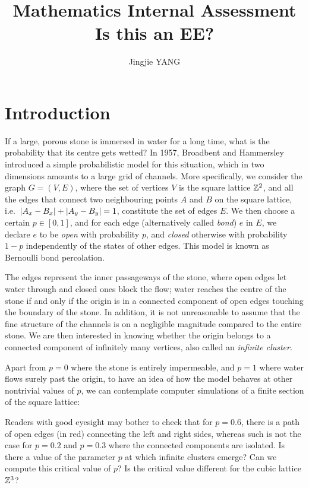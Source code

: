 \documentclass[a4paper, 12pt]{article}
\title{
\textbf{Mathematics Internal Assessment}\\
\bigskip
Is this an EE?
}
\author{Jingjie YANG}
\date{}
\begin{document}
\maketitle

\section{Introduction}\label{ch:intro}
If a large, porous stone is immersed in water for a long time, what is the probability that its centre gets wetted? In 1957, Broadbent and Hammersley \autocite*[693]{broadbent_hammersley_1957} introduced a simple probabilistic model for this situation, which in two dimensions amounts to a large grid of channels. More specifically, we consider the graph $G = (V, E)$, where the set of vertices $V$ is the square lattice $\mathbb{Z}^2$, and all the edges that connect two neighbouring points $A$ and $B$ on the square lattice, i.e.\ $\lvert A_x - B_x \rvert + \lvert A_y - B_y \rvert = 1$, constitute the set of edges $E$. We then choose a certain $p \in [0, 1]$, and for each edge (alternatively called \textit{bond}) $e$ in $E$, we declare $e$ to be \textit{open} with probability $p$, and \textit{closed} otherwise with probability $1 - p$ independently of the states of other edges. This model is known as Bernoulli bond percolation.



The edges represent the inner passageways of the stone, where open edges let water through and closed ones block the flow; water reaches the centre of the stone if and only if the origin is in a connected component of open edges touching the boundary of the stone. In addition, it is not unreasonable to assume that the fine structure of the channels is on a negligible magnitude compared to the entire stone. We are then interested in knowing whether the origin belongs to a connected component of infinitely many vertices, also called an \textit{infinite cluster}. 

Apart from $p = 0$ where the stone is entirely impermeable, and $p = 1$ where water flows surely past the origin, to have an idea of how the model behaves at other nontrivial values of $p$, we can contemplate computer simulations of a finite section of the square lattice:


\break

Readers with good eyesight may bother to check that for $p = 0.6$, there is a path of open edges (in red) connecting the left and right sides, whereas such is not the case for $p = 0.2$ and $p = 0.3$ where the connected components are isolated. Is there a value of the parameter $p$ at which infinite clusters emerge? Can we compute this critical value of $p$? Is the critical value different for the cubic lattice $\mathbb{Z}^3$? 
\end{document}
